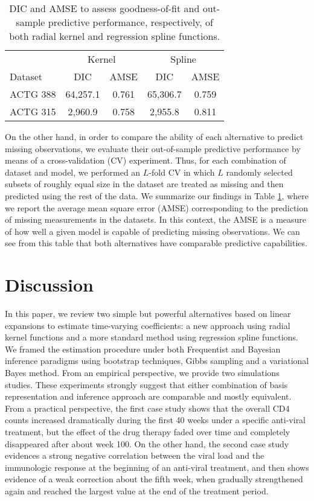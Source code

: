 \documentclass[letterpaper,10pt,openany]{article}
\begin{document}
\begin{table}[!h]
	\centering
	\begin{tabular}{lcccc}  
		\hline
		\multicolumn{1}{c}{} & \multicolumn{2}{c}{Kernel} & \multicolumn{2}{c}{Spline} \\ \cmidrule{2-5}
		Dataset  & \textsf{DIC} & \textsf{AMSE} & \textsf{DIC} & \textsf{AMSE} \\ 
		\hline
		ACTG 388 & 64,257.1  & 0.761  & 65,306.7  & 0.759 \\
		ACTG 315 & 2,960.9   & 0.758  & 2,955.8   & 0.811 \\
		\hline
	\end{tabular}
	\caption{\textsf{DIC} and \textsf{AMSE} to assess goodness-of-fit and out-sample predictive performance, respectively, of both radial kernel and regression spline functions.}\label{tab_datasets_amse}
\end{table}


On the other hand, in order to compare the ability of each alternative to predict missing observations, we evaluate their out-of-sample predictive performance by means of a cross-validation (CV) experiment. Thus, for each combination of dataset and model, we performed an $L$-fold CV in which $L$ randomly selected subsets of roughly equal size in the dataset are treated as missing and then predicted using the rest of the data. We summarize our findings in Table \ref{tab_datasets_amse}, where we report the average mean square error (\textsf{AMSE}) corresponding to the prediction of missing measurements in the datasets.  In this context, the \textsf{AMSE} is a measure of how well a given model is capable of predicting missing observations. We can see from this table that both alternatives have comparable predictive capabilities.


\section{Discussion}\label{sec_discussion}


In this paper, we review two simple but powerful alternatives based on linear expansions to estimate time-varying coefficients: a new approach using radial kernel functions and a more standard method using regression spline functions. We framed the estimation procedure under both Frequentist and Bayesian inference paradigms using bootstrap techniques, Gibbs sampling and a variational Bayes method. From an empirical perspective, we provide two simulations studies. These experiments strongly suggest that either combination of basis representation and inference approach are comparable and mostly equivalent. From a practical perspective, the first case study shows that the overall CD4 counts increased dramatically during the first 40 weeks under a specific anti-viral treatment, but the effect of the drug therapy faded over time and completely disappeared after about week 100. On the other hand, the second case study evidences a strong negative correlation between the viral load and the immunologic response at the beginning of an anti-viral treatment, and then shows evidence of a weak correction about the fifth week, when gradually strengthened again and reached the largest value at the end of the treatment period.
\end{document}
